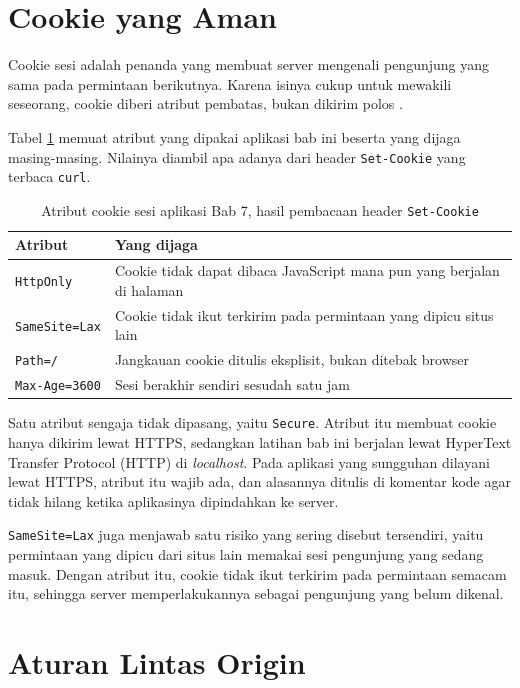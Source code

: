 \section{Cookie yang Aman}

Cookie sesi adalah penanda yang membuat server mengenali pengunjung yang sama
pada permintaan berikutnya. Karena isinya cukup untuk mewakili seseorang,
cookie diberi atribut pembatas, bukan dikirim polos \cite{rfc6265}.

Tabel \ref{tab:cookie} memuat atribut yang dipakai aplikasi bab ini beserta
yang dijaga masing-masing. Nilainya diambil apa adanya dari header
\texttt{Set-Cookie} yang terbaca \texttt{curl}.

\begin{table}[!htb]
  \centering
  \caption{Atribut cookie sesi aplikasi Bab 7, hasil pembacaan header
           \texttt{Set-Cookie}}
  \label{tab:cookie}
  \begin{tabularx}{\textwidth}{lX}
    \hline
    \textbf{Atribut} & \textbf{Yang dijaga} \\
    \hline
    \texttt{HttpOnly} & Cookie tidak dapat dibaca JavaScript mana pun yang berjalan di halaman \\
    \hline
    \texttt{SameSite=Lax} & Cookie tidak ikut terkirim pada permintaan yang dipicu situs lain \\
    \hline
    \texttt{Path=/} & Jangkauan cookie ditulis eksplisit, bukan ditebak browser \\
    \hline
    \texttt{Max-Age=3600} & Sesi berakhir sendiri sesudah satu jam \\
    \hline
  \end{tabularx}
\end{table}

Satu atribut sengaja tidak dipasang, yaitu \texttt{Secure}. Atribut itu
membuat cookie hanya dikirim lewat HTTPS, sedangkan latihan bab ini berjalan
lewat HyperText Transfer Protocol (HTTP) di \textit{localhost}. Pada aplikasi yang sungguhan dilayani lewat
HTTPS, atribut itu wajib ada, dan alasannya ditulis di komentar kode agar
tidak hilang ketika aplikasinya dipindahkan ke server.

\texttt{SameSite=Lax} juga menjawab satu risiko yang sering disebut
tersendiri, yaitu permintaan yang dipicu dari situs lain memakai sesi
pengunjung yang sedang masuk. Dengan atribut itu, cookie tidak ikut terkirim
pada permintaan semacam itu, sehingga server memperlakukannya sebagai
pengunjung yang belum dikenal.

\section{Aturan Lintas Origin}

